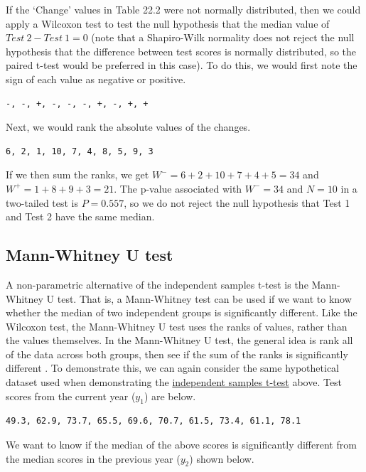 \documentclass[
  openany]{krantz}
\begin{document}
If the `Change' values in Table 22.2 were not normally distributed, then we could apply a Wilcoxon test to test the null hypothesis that the median value of \(Test\:2 - Test\:1 = 0\) (note that a Shapiro-Wilk normality does not reject the null hypothesis that the difference between test scores is normally distributed, so the paired t-test would be preferred in this case).
To do this, we would first note the sign of each value as negative or positive.

\begin{verbatim}
-, -, +, -, -, -, +, -, +, +
\end{verbatim}

Next, we would rank the absolute values of the changes.

\begin{verbatim}
6, 2, 1, 10, 7, 4, 8, 5, 9, 3
\end{verbatim}

If we then sum the ranks, we get \(W^{-} = 6 + 2 + 10 + 7 + 4 + 5 = 34\) and \(W^{+} = 1 + 8 + 9 + 3 = 21\).
The p-value associated with \(W^{-} = 34\) and \(N = 10\) in a two-tailed test is \(P = 0.557\), so we do not reject the null hypothesis that Test 1 and Test 2 have the same median.

\hypertarget{mann-whitney-u-test}{%
\subsection{Mann-Whitney U test}\label{mann-whitney-u-test}}

A non-parametric alternative of the independent samples t-test is the Mann-Whitney U test.
That is, a Mann-Whitney test can be used if we want to know whether the median of two independent groups is significantly different.
Like the Wilcoxon test, the Mann-Whitney U test uses the ranks of values, rather than the values themselves.
In the Mann-Whitney U test, the general idea is rank all of the data across both groups, then see if the sum of the ranks is significantly different \citep{Sokal1995}.
To demonstrate this, we can again consider the same hypothetical dataset used when demonstrating the \protect\hyperlink{independent-samples-t-test}{independent samples t-test} above.
Test scores from the current year (\(y_{1}\)) are below.

\begin{verbatim}
49.3, 62.9, 73.7, 65.5, 69.6, 70.7, 61.5, 73.4, 61.1, 78.1
\end{verbatim}

We want to know if the median of the above scores is significantly different from the median scores in the previous year (\(y_{2}\)) shown below.
\end{document}
